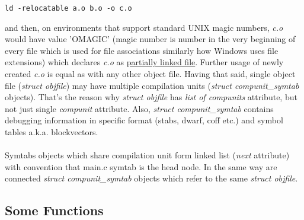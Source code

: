\documentclass{report}
\begin{document}
\begin{verbatim}
ld -relocatable a.o b.o -o c.o
\end{verbatim}
and then, on environments that support standard UNIX magic numbers, \textit{c.o} would have value 'OMAGIC' (magic number is number in the very beginning of every file which is used for file associations similarly how Windows uses file extensions) which declares \textit{c.o} as \underline{partially linked file}. Further usage of newly created \textit{c.o} is equal as with any other object file.
Having that said, single object file (\textit{struct objfile}) may have multiple compilation units (\textit{struct compunit\_symtab} objects). That's the reason why \textit{struct objfile} has \textit{list of compunits} attribute, but not just single \textit{compunit} attribute.
Also, \textit{struct compunit\_symtab} contains debugging information in specific format (stabs, dwarf, coff etc.) and symbol tables a.k.a. blockvectors. \\ \\
Symtabs objects which share compilation unit form linked list (\textit{next} attribute) with convention that main.c symtab is the head node.
In the same way are connected \textit{struct compunit\_symtab} objects which refer to the same \textit{struct objfile}.
\subsection *{Some Functions}
\inputminted{c}{important_gdb_functions.c}
	
\end{document}
